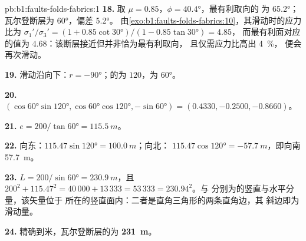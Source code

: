 \begin{solution}{pb:b1:faults-folds-fabrics:1}
\textbf{18.} 取 $\mu = 0.85$，$\phi = \ang{40.4}$，最有利取向的
为 \ang{65.2}；瓦尔登断层为 \ang{60}，偏差 \ang{5.2}。
由\cref{exo:b1:faults-folds-fabrics:10}，其滑动时的应力比为
$\sigma_1'/\sigma_3' = (1 + 0.85\cot\ang{30})/(1 - 0.85\tan\ang{30}) = 4.85$，
而最有利面对应的值为 $4.68$：该断层接近但并非恰为最有利取向，
且仅需应力比高出 \qty{4}{\percent}，
便会再次滑动。

\textbf{19.} 滑动沿向下：$r = \ang{-90}$；的为
$120$，为 \ang{60}。

\textbf{20.} $(\cos\ang{60}\sin\ang{120}, \cos\ang{60}\cos\ang{120},
-\sin\ang{60}) = (0.4330, -0.2500, -0.8660)$。

\textbf{21.} $e = 200/\tan\ang{60} = \qty{115.5}{m}$。

\textbf{22.} 向东：$115.47\sin\ang{120} = \qty{100.0}{m}$；向北：
$115.47\cos\ang{120} = \qty{-57.7}{m}$，即向南 \qty{57.7}{m}。

\textbf{23.} $L = 200/\sin\ang{60} = \qty{230.9}{m}$，且
$200^2 + 115.47^2 = 40\,000 + 13\,333 = 53\,333 = 230.94^2$。与
分别为的竖直与水平分量，该矢量位于
所在的竖直面内：二者是直角三角形的两条直角边，其
斜边即为滑动量。

\textbf{24.} 精确到米，瓦尔登断层的为
\textbf{\qty[text-series-to-math=true]{231}{m}}。
\end{solution}
